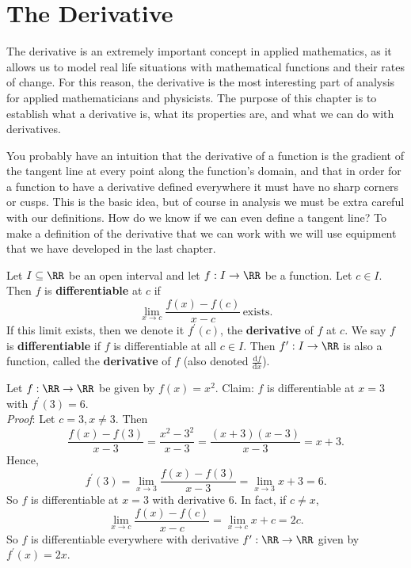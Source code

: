 \documentclass[../real_analysis.tex]{subfiles}
\begin{document}
    \section{The Derivative}
        The derivative is an extremely important concept in applied mathematics, as it allows us to model real life situations with mathematical functions and their rates of change. For this reason, the derivative is the most interesting part of analysis for applied mathematicians and physicists. The purpose of this chapter is to establish what a derivative is, what its properties are, and what we can do with derivatives.

        You probably have an intuition that the derivative of a function is the gradient of the tangent line at every point along the function's domain, and that in order for a function to have a derivative defined everywhere it must have no sharp corners or cusps. This is the basic idea, but of course in analysis we must be extra careful with our definitions. How do we know if we can even define a tangent line? To make a definition of the derivative that we can work with we will use equipment that we have developed in the last chapter.
        \begin{definition}
            Let $I\subseteq\RR$ be an open interval and let $f: I\to\RR$ be a function. Let $c\in I$. Then $f$ is \textbf{differentiable} at $c$ if
            \begin{equation}
                \lim_{x\to c}\frac{f(x)-f(c)}{x-c}\,\text{exists.}
            \end{equation}
            If this limit exists, then we denote it $f^\prime(c)$, the \textbf{derivative} of $f$ at $c$. We say $f$ is \textbf{differentiable} if $f$ is differentiable at all $c\in I$. Then $f^\prime:I\to\RR$ is also a function, called the \textbf{derivative} of $f$ (also denoted $\frac{\mathrm{d}f}{\mathrm{d}x}$).
        \end{definition}
        \begin{example}
            Let $f:\RR\to\RR$ be given by $f(x)=x^2$. Claim: $f$ is differentiable at $x=3$ with $f^\prime(3)=6$.\\
            \textit{Proof}: Let $c=3, x\neq3$. Then
            \begin{equation}
                \frac{f(x)-f(3)}{x-3}=\frac{x^2-3^2}{x-3}=\frac{(x+3)(x-3)}{x-3}=x+3.
            \end{equation}
            Hence,
            \begin{equation}
                f^\prime(3)=\lim_{x\to3}\frac{f(x)-f(3)}{x-3}=\lim_{x\to3}x+3=6.
            \end{equation}
            So $f$ is differentiable at $x=3$ with derivative 6. In fact, if $c\neq x$,
            \begin{equation}
                \lim_{x\to c}\frac{f(x)-f(c)}{x-c}=\lim_{x\to c}x+c=2c.
            \end{equation}
            So $f$ is differentiable everywhere with derivative $f^\prime:\RR\to\RR$ given by $f^\prime(x)=2x$.
        \end{example}
\end{document}
